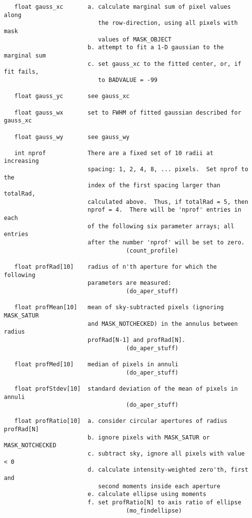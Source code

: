 \begin{verbatim}
   float gauss_xc       a. calculate marginal sum of pixel values along
                           the row-direction, using all pixels with mask
                           values of MASK_OBJECT
                        b. attempt to fit a 1-D gaussian to the marginal sum
                        c. set gauss_xc to the fitted center, or, if fit fails,
                           to BADVALUE = -99
                        
   float gauss_yc       see gauss_xc

   float gauss_wx       set to FWHM of fitted gaussian described for gauss_xc

   float gauss_wy       see gauss_wy

   int nprof            There are a fixed set of 10 radii at increasing
                        spacing: 1, 2, 4, 8, ... pixels.  Set nprof to the
                        index of the first spacing larger than totalRad, 
                        calculated above.  Thus, if totalRad = 5, then
                        nprof = 4.  There will be 'nprof' entries in each
                        of the following six parameter arrays; all entries
                        after the number 'nprof' will be set to zero.
                                   (count_profile)

   float profRad[10]    radius of n'th aperture for which the following
                        parameters are measured:
                                   (do_aper_stuff)

   float profMean[10]   mean of sky-subtracted pixels (ignoring MASK_SATUR
                        and MASK_NOTCHECKED) in the annulus between radius
                        profRad[N-1] and profRad[N].
                                   (do_aper_stuff)

   float profMed[10]    median of pixels in annuli
                                   (do_aper_stuff)

   float profStdev[10]  standard deviation of the mean of pixels in annuli
                                   (do_aper_stuff)

   float profRatio[10]  a. consider circular apertures of radius profRad[N]
                        b. ignore pixels with MASK_SATUR or MASK_NOTCHECKED
                        c. subtract sky, ignore all pixels with value < 0
                        d. calculate intensity-weighted zero'th, first and
                           second moments inside each aperture
                        e. calculate ellipse using moments
                        f. set profRatio[N] to axis ratio of ellipse
                                   (mo_findellipse)


\end{verbatim}

